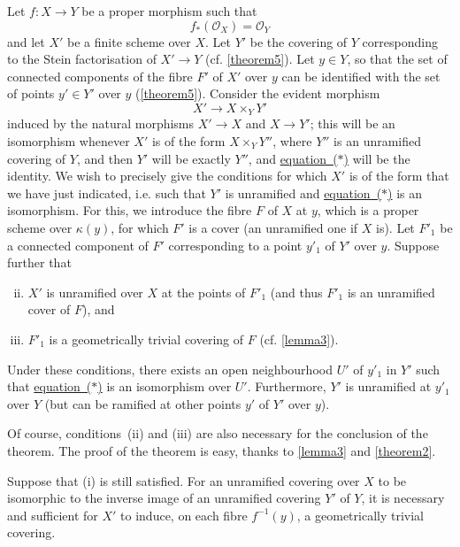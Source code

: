 \documentclass{article}
\theoremstyle{plain}
\newenvironment{theorem}[1]
  {\renewcommand\theinnercustomtheorem{#1}\innercustomtheorem}
  {\endinnercustomtheorem}
\newenvironment{corollary}[1]
  {\renewcommand\theinnercustomcorollary{#1}\innercustomcorollary}
  {\endinnercustomcorollary}
\theoremstyle{definition}
\newcommand{\sh}{\mathscr}
\newcommand{\kres}{\kappa}
\newcommand{\oldpage}[1]{\marginpar{\footnotesize$\Big\vert$ \textit{p.~#1}}}
\begin{document}
Let $f\colon X\to Y$ be a proper morphism such that
\[
\label{equationi}
  f_*(\sh{O}_X) = \sh{O}_Y
\tag{i}
\]
and let $X'$ be a finite scheme over $X$.
Let $Y'$ be the covering of $Y$ corresponding to the Stein factorisation of $X'\to Y$ (cf. \cref{theorem5}).
Let $y\in Y$, so that the set of connected components of the fibre $F'$ of $X'$ over $y$ can be identified with the set of points $y'\in Y'$ over $y$ (\cref{theorem5}).
Consider the evident morphism
\[
\label{equation*}
  X'\to X\times_Y Y'
\tag{$*$}
\]
induced by the natural morphisms $X'\to X$ and $X\to Y'$;
this will be an isomorphism whenever $X'$ is of the form $X\times_Y Y''$, where $Y''$ is an unramified covering of $Y$, and then $Y'$ will be exactly $Y''$, and \hyperref[equation*]{equation~($*$)} will be the identity.
We wish to precisely give the conditions for which $X'$ is of the form that we have just indicated, i.e. such that $Y'$ is unramified and \hyperref[equation*]{equation~($*$)} is an isomorphism.
For this, we introduce the fibre $F$ of $X$ at $y$, which is a proper scheme over $\kres(y)$, for which $F'$ is a cover (an unramified one if $X$ is).
Let $F'_1$ be a connected component of $F'$ corresponding to a point $y'_1$ of $Y'$ over $y$.
Suppose further that
\begin{enumerate}[(i)]
\setcounter{enumi}{1}
  \item $X'$ is unramified over $X$ at the points of $F'_1$ (and thus $F'_1$ is an unramified cover of $F$), and
  \item $F'_1$ is a geometrically trivial covering of $F$ (cf. \cref{lemma3}).
\end{enumerate}

\begin{theorem}{11}
\label{theorem11}
  Under these conditions, there exists an open neighbourhood $U'$ of $y'_1$
\oldpage{182-22}
  in $Y'$ such that \hyperref[equation*]{equation~($*$)} is an isomorphism over $U'$.
  Furthermore, $Y'$ is unramified at $y'_1$ over $Y$ (but can be ramified at other points $y'$ of $Y'$ over $y$).
\end{theorem}

Of course, conditions~(ii) and (iii) are also necessary for the conclusion of the theorem.
The proof of the theorem is easy, thanks to \cref{lemma3} and \cref{theorem2}.

\begin{corollary}{1}
\label{theorem11corollary1}
  Suppose that (i) is still satisfied.
  For an unramified covering over $X$ to be isomorphic to the inverse image of an unramified covering $Y'$ of $Y$, it is necessary and sufficient for $X'$ to induce, on each fibre $f^{-1}(y)$, a geometrically trivial covering.
\end{corollary}
\end{document}
